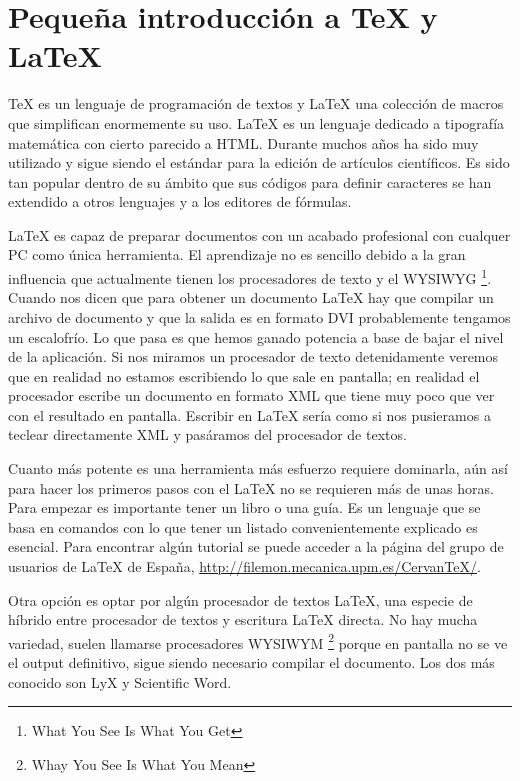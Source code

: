 \chapter{Pequeña introducción a \TeX{} y
  \LaTeX{}}

\TeX{} es un lenguaje de programación de textos y \LaTeX{} una
colección de macros que simplifican enormemente su uso. \LaTeX{} es un
lenguaje dedicado a tipografía matemática con cierto parecido a HTML.
Durante muchos años ha sido muy utilizado y sigue siendo el estándar
para la edición de artículos científicos. Es sido tan popular dentro
de su ámbito que sus códigos para definir caracteres se han extendido
a otros lenguajes y a los editores de fórmulas.

\LaTeX{} es capaz de preparar documentos con un acabado profesional
con cualquer PC como única herramienta. El aprendizaje no es sencillo
debido a la gran influencia que actualmente tienen los procesadores de
texto y el WYSIWYG%
\footnote{What You See Is What You Get%
}. Cuando nos dicen que para obtener un documento \LaTeX{} hay que
compilar un archivo de documento y que la salida es en formato DVI
probablemente tengamos un escalofrío. Lo que pasa es que hemos ganado
potencia a base de bajar el nivel de la aplicación. Si nos miramos un
procesador de texto detenidamente veremos que en realidad no estamos
escribiendo lo que sale en pantalla; en realidad el procesador escribe
un documento en formato XML que tiene muy poco que ver con el
resultado en pantalla. Escribir en \LaTeX{} sería como si nos
pusieramos a teclear directamente XML y pasáramos del procesador de
textos.

Cuanto más potente es una herramienta más esfuerzo requiere dominarla,
aún así para hacer los primeros pasos con el \LaTeX{} no se requieren
más de unas horas. Para empezar es importante tener un libro o una
guía. Es un lenguaje que se basa en comandos con lo que tener un
listado convenientemente explicado es esencial. Para encontrar algún
tutorial se puede acceder a la página del grupo de usuarios de
\LaTeX{} de España, \url{http://filemon.mecanica.upm.es/CervanTeX/}.

Otra opción es optar por algún procesador de textos \LaTeX{}, una
especie de híbrido entre procesador de textos y escritura \LaTeX{}
directa. No hay mucha variedad, suelen llamarse procesadores WYSIWYM%
\footnote{Whay You See Is What You Mean%
} porque en pantalla no se ve el output definitivo, sigue siendo
necesario compilar el documento. Los dos más conocido son LyX y
Scientific Word.

